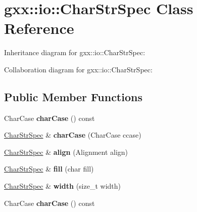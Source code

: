 \hypertarget{classgxx_1_1io_1_1CharStrSpec}{}\section{gxx\+:\+:io\+:\+:Char\+Str\+Spec Class Reference}
\label{classgxx_1_1io_1_1CharStrSpec}


Inheritance diagram for gxx\+:\+:io\+:\+:Char\+Str\+Spec\+:


Collaboration diagram for gxx\+:\+:io\+:\+:Char\+Str\+Spec\+:
\subsection*{Public Member Functions}
\begin{DoxyCompactItemize}
\item 
Char\+Case {\bfseries char\+Case} () const \hypertarget{classgxx_1_1io_1_1CharStrSpec_ab3b9dbaf9f770d9a154c6ec8a2594cfb}{}\label{classgxx_1_1io_1_1CharStrSpec_ab3b9dbaf9f770d9a154c6ec8a2594cfb}

\item 
\hyperlink{classgxx_1_1io_1_1CharStrSpec}{Char\+Str\+Spec} \& {\bfseries char\+Case} (Char\+Case ccase)\hypertarget{classgxx_1_1io_1_1CharStrSpec_a7ae04a1d41418f5a856bf5101b27f108}{}\label{classgxx_1_1io_1_1CharStrSpec_a7ae04a1d41418f5a856bf5101b27f108}

\item 
\hyperlink{classgxx_1_1io_1_1CharStrSpec}{Char\+Str\+Spec} \& {\bfseries align} (Alignment align)\hypertarget{classgxx_1_1io_1_1CharStrSpec_ab1c6966b305170da20e3742c64417cce}{}\label{classgxx_1_1io_1_1CharStrSpec_ab1c6966b305170da20e3742c64417cce}

\item 
\hyperlink{classgxx_1_1io_1_1CharStrSpec}{Char\+Str\+Spec} \& {\bfseries fill} (char fill)\hypertarget{classgxx_1_1io_1_1CharStrSpec_af54cb7ea3744f0551d59ae3b91c3969c}{}\label{classgxx_1_1io_1_1CharStrSpec_af54cb7ea3744f0551d59ae3b91c3969c}

\item 
\hyperlink{classgxx_1_1io_1_1CharStrSpec}{Char\+Str\+Spec} \& {\bfseries width} (size\+\_\+t width)\hypertarget{classgxx_1_1io_1_1CharStrSpec_a49603cb128afc1799f20fa7882e79f55}{}\label{classgxx_1_1io_1_1CharStrSpec_a49603cb128afc1799f20fa7882e79f55}

\item 
Char\+Case {\bfseries char\+Case} () const \hypertarget{classgxx_1_1io_1_1CharStrSpec_ab3b9dbaf9f770d9a154c6ec8a2594cfb}{}\label{classgxx_1_1io_1_1CharStrSpec_ab3b9dbaf9f770d9a154c6ec8a2594cfb}


\end{DoxyCompactItemize}
